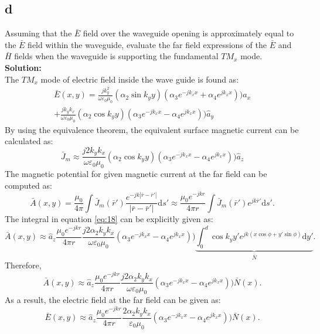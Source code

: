 \documentclass[11pt]{amsart}
\begin{document}
\subsection*{d}
Assuming that the $\bar{E}$ field over the waveguide opening is approximately equal to the $\bar{E}$ field within the waveguide, evaluate the far field expressions of the $\bar{E}$ and $\bar{H}$ fields when the waveguide is supporting the fundamental $TM_x$ mode.
\\
\textbf{Solution:}\\
The $TM_x$ mode of electric field inside the wave guide is found as:
\begin{equation}
\label{eq:17}
\begin{split}
\bar{E}(x,y)= \frac{j k_{y}^2}{\omega \varepsilon_0 \mu_0 }(\alpha_2 \sin k_y y)(\alpha_3 e^{-j k_x x}+\alpha_4 e^{j k_x x}))\hat{a}_x
\\
+\frac{j k_{y}k_{x}}{\omega \varepsilon_0 \mu_0 }( \alpha_2 \cos k_y y)(\alpha_3 e^{-j k_x x}-\alpha_4 e^{j k_x x}))\hat{a}_y
\end{split}
\end{equation}
By using the equivalence theorem, the equivalent surface magnetic current can be calculated as:
\begin{equation}
\bar{J}_m \approx \frac{j 2 k_{y}k_{x}}{\omega \varepsilon_0 \mu_0 }( \alpha_2 \cos k_y y)(\alpha_3 e^{-j k_x x}-\alpha_4 e^{j k_x x}))\hat{a}_z
\end{equation}
The magnetic potential for given magnetic current at the far field can be computed as:
\begin{equation}
\label{eq:18}
\bar{A}(x,y)=\frac{\mu_0}{4 \pi}\int \bar{J}_m(\bar{r}') \frac{e^{-jk\left | \bar{r}-\bar{r}' \right |}}{\left | \bar{r}-\bar{r}' \right |}\mathrm{d} s' \approx \frac{\mu_0 e^{-jkr}}{4 \pi r}\int \bar{J}_m(\bar{r}') e^{jk\bar{r}'}\mathrm{d} s'.
\end{equation}
The integral in equation \ref{eq:18} can be explicitly given as:
\begin{equation}
\label{eq:19}
\bar{A}(x,y) \approx \hat{a}_z \frac{\mu_0 e^{-jkr}}{4 \pi r}\frac{j 2 \alpha_2 k_{y}k_{x}}{\omega \varepsilon_0 \mu_0 }(\alpha_3 e^{-j k_x x}-\alpha_4 e^{j k_x x})) \underbrace{\int_{0}^{d} \cos k_y y' e^{jk (x\cos \phi+y'\sin \phi)}\mathrm{d} y'}_{\bar{N}}.
\end{equation}
Therefore,
\begin{equation}
\bar{A}(x,y) \approx \hat{a}_z \frac{\mu_0 e^{-jkr}}{4 \pi r}\frac{j 2 \alpha_2 k_{y}k_{x}}{\omega \varepsilon_0 \mu_0 }(\alpha_3 e^{-j k_x x}-\alpha_4 e^{j k_x x}))\bar{N}(x).
\end{equation}
As a result, the electric field at the far field can be given as:
\begin{equation}
\bar{E}(x,y) \approx \hat{a}_z \frac{\mu_0 e^{-jkr}}{4 \pi r}\frac{2 \alpha_2 k_{y}k_{x}}{\varepsilon_0 \mu_0 }(\alpha_3 e^{-j k_x x}-\alpha_4 e^{j k_x x}))\bar{N}(x).
\end{equation}
\end{document}
